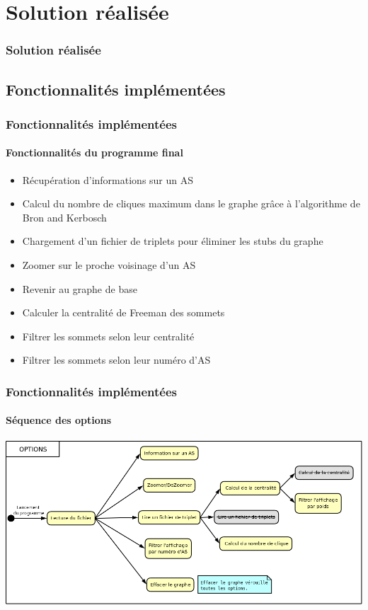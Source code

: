 \section{Solution r\'ealis\'ee}

\begin{frame}
 	\frametitle{Solution r\'ealis\'ee}
\end{frame}

\subsection{Fonctionnalit\'es impl\'ement\'ees}
\frame
{
\frametitle{Fonctionnalit\'es impl\'ement\'ees}
\framesubtitle{Fonctionnalit\'es du programme final}
\begin{itemize}
 \item<1-8> R\'ecup\'eration d'informations sur un AS
 \item<2-8> Calcul du nombre de cliques maximum dans le graphe gr\^ace \`a l'algorithme de Bron and Kerbosch
 \item<3-8> Chargement d'un fichier de triplets pour \'eliminer les stubs du graphe
 \item<4-8> Zoomer sur le proche voisinage d'un AS
 \item<5-8> Revenir au graphe de base
 \item<6-8> Calculer la centralit\'e de Freeman des sommets
 \item<7-8> Filtrer les sommets selon leur centralit\'e
 \item<8> Filtrer les sommets selon leur num\'ero d'AS
\end{itemize}
}
\frame
{
\frametitle{Fonctionnalit\'es impl\'ement\'ees}
\framesubtitle{S\'equence des options}
\includegraphics[width=\textwidth]{./seqMenu.png}
}

